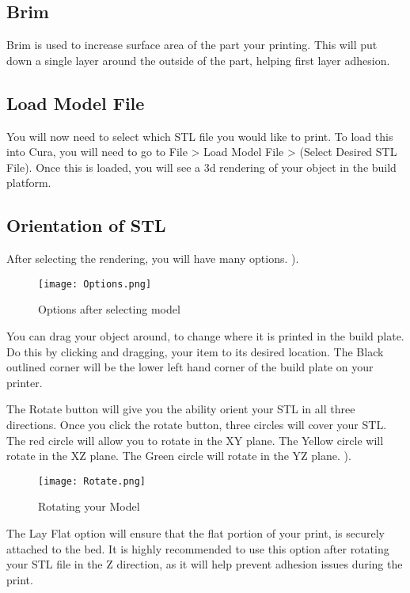 \subsection{Brim}

Brim is used to increase surface area of the part your printing. This will put down a single layer around the outside of the part, helping first layer adhesion.

\subsection{Load Model File}

You will now need to select which STL file you would like to print. To load this into Cura, you will need to go to File > Load Model File > (Select Desired STL File). Once this is loaded, you will see a 3d rendering of your object in the build platform. 

\subsection{Orientation of STL}

After selecting the rendering, you will have many options. 
\pageref{fig:Options}).
\begin{figure}[hbt]
\centering
\texttt{[image: Options.png]}
\caption{Options after selecting model}
\label{fig:Orientation}
\end{figure}

You can drag your object around, to change where it is printed in the build plate. Do this by clicking and dragging, your item to its desired location. The Black outlined corner will be the lower left hand corner of the build plate on your printer. 

The Rotate button will give you the ability orient your STL in all three directions. Once you click the rotate button, three circles will cover your STL. The red circle will allow you to rotate in the XY plane. The Yellow circle will rotate in the XZ plane. The Green circle will rotate in the YZ plane.
\pageref{fig:Rotating}).
\begin{figure}[hbt]
\centering
\texttt{[image: Rotate.png]}
\caption{Rotating your Model}
\label{fig:Rotating your Model}
\end{figure}

The Lay Flat option will ensure that the flat portion of your print, is securely attached to the bed. It is highly recommended to use this option after rotating your STL file in the Z direction, as it will help prevent adhesion issues during the print.

